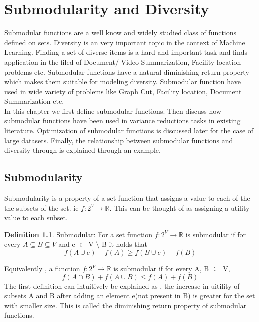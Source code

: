 \documentclass[a4paper,twoside]{iiththesis}
\theoremstyle{definition}
\newtheorem{definition}{Definition}[section]
\theoremstyle{definition}
\theoremstyle{remark}
\begin{document}
\chapter{Submodularity and Diversity }

Submodular functions are a well know and widely studied class of functions defined on sets. Diversity is an very important topic in the context of Machine Learning. Finding a set of diverse items is a hard and important task and finds application in the filed of Document/ Video Summarization, Facility location problems etc. Submodular functions have a natural diminishing return property which makes them suitable for modeling diversity. Submodular function have used in wide variety of problems like Graph Cut, Facility location, Document Summarization etc. \\
In this chapter we first define submodular functions. Then discuss how submodular functions have been used in variance reductions tasks in existing literature. Optimization of submodular functions is discussed later for the case of large datasets. Finally, the relationship between submodular functions and diversity through is explained through an example.


\section{Submodularity}

Submodularity is a property of a set function that assigns a value to each of the the subsets of the set. ie  $ f: 2^V \rightarrow \mathbb{R}$. This can be thought of as assigning a utility value to each subset.
\theoremstyle{definition}
\begin{definition}{Submodular:}
For a set function $ f: 2^V \rightarrow \mathbb{R}$ is submodular if for every $ A \subseteq B \subseteq V $ and e $\in$ V $\setminus$ B it holds that 
\begin{equation}
			f(A \cup e) - f(A) \geq f(B \cup e) - f(B)
\end{equation}
\end{definition}
Equivalently , a function $ f: 2^V \rightarrow \mathbb{R}$  is submodular if for every A, B $\subseteq$ V, 
\begin{equation}
f(A\cap B) + f(A \cup B) \leq f(A) + f(B)
\end{equation}
The first definition can intuitively be explained as , the increase in uitility of subsets A and B after adding an element e(not present in B) is greater for the set with smaller size. This is called the diminishing return property of submodular functions.
\\
\end{document}
